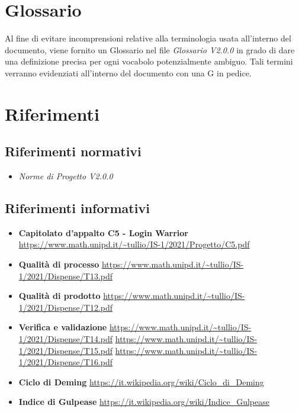 \section{Glossario}
Al fine di evitare incomprensioni relative alla terminologia usata all'interno del documento, viene fornito un Glossario nel file \textit{Glossario V2.0.0} in grado di dare una definizione precisa per ogni vocabolo potenzialmente ambiguo. Tali termini verranno evidenziati all'interno del documento con una G in pedice.

\section{Riferimenti}
\subsection{Riferimenti normativi}
\begin{itemize}
  \item \textit{Norme di Progetto V2.0.0}
\end{itemize}
\subsection{Riferimenti informativi}
\begin{itemize}
  \item \textbf{Capitolato d'appalto C5 - Login Warrior}
          \url{https://www.math.unipd.it/~tullio/IS-1/2021/Progetto/C5.pdf}
  \item \textbf{Qualità di processo}
          \url{https://www.math.unipd.it/~tullio/IS-1/2021/Dispense/T13.pdf}
  \item \textbf{Qualità di prodotto}
          \url{https://www.math.unipd.it/~tullio/IS-1/2021/Dispense/T12.pdf}
  \item \textbf{Verifica e validazione}
          \url{https://www.math.unipd.it/~tullio/IS-1/2021/Dispense/T14.pdf}
          \url{https://www.math.unipd.it/~tullio/IS-1/2021/Dispense/T15.pdf}
          \url{https://www.math.unipd.it/~tullio/IS-1/2021/Dispense/T16.pdf}
  \item \textbf{Ciclo di Deming}
          \url{https://it.wikipedia.org/wiki/Ciclo_di_Deming}
  \item \textbf{Indice di Gulpease}
          \url{https://it.wikipedia.org/wiki/Indice_Gulpease}
\end{itemize}
